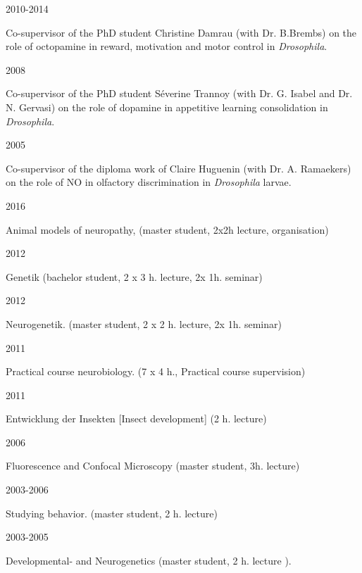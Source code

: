 
\parbox{0.15\textwidth}{2010-2014}\hfill
	\parbox[t]{0.83\textwidth}{Co-supervisor of the PhD student Christine Damrau
(with Dr. B.Brembs) on the role of octopamine in reward, motivation and motor control in  \textit{Drosophila}.}
\parbox{0.15\textwidth}{2008}\hfill
	\parbox[t]{0.83\textwidth}{Co-supervisor of the PhD student S\'everine Trannoy
(with Dr. G. Isabel and Dr. N. Gervasi) on the role of dopamine in appetitive learning consolidation in  \textit{Drosophila}.}
\parbox{0.15\textwidth}{2005}\hfill
\parbox[t]{0.83\textwidth}{Co-supervisor of the diploma work of Claire Huguenin
(with Dr. A. Ramaekers) on the role of NO in olfactory discrimination in \textit{Drosophila} larvae.}





\parbox{0.15\textwidth}{2016}\hfill
\parbox[t]{0.83\textwidth}{Animal models of neuropathy, (master student, 2x2h lecture, organisation)}
%
\parbox{0.15\textwidth}{2012}\hfill
\parbox[t]{0.83\textwidth}{Genetik (bachelor student, 2 x 3 h. lecture, 2x 1h. seminar)}
\parbox{0.15\textwidth}{2012}\hfill
\parbox[t]{0.83\textwidth}{Neurogenetik. (master student, 2 x 2 h. lecture, 2x 1h. seminar)}
\parbox{0.15\textwidth}{2011}\hfill
\parbox[t]{0.83\textwidth}{Practical course neurobiology. (7 x 4 h., Practical course supervision)}
\parbox{0.15\textwidth}{2011}\hfill
\parbox[t]{0.83\textwidth}{Entwicklung der Insekten [Insect development] (2 h. lecture)}
\parbox{0.15\textwidth}{2006}\hfill
\parbox[t]{0.83\textwidth}{Fluorescence and Confocal Microscopy (master student, 3h. lecture)}
\parbox{0.15\textwidth}{2003-2006}\hfill
\parbox[t]{0.83\textwidth}{Studying behavior. (master student, 2 h. lecture)}
\parbox{0.15\textwidth}{2003-2005}\hfill
\parbox[t]{0.83\textwidth}{Developmental- and Neurogenetics %
(master student, 2 h. lecture%
).}


